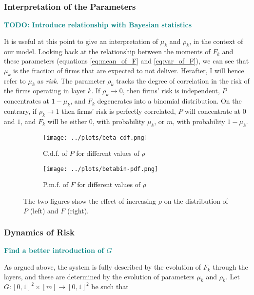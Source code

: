 \documentclass[american, abstract=on]{scrartcl}
\theoremstyle{plain}
\newcommand\notes[1]{\textcolor{teal}{\footnotesize \textbf{#1}}}
\begin{document}
\subsubsection{Interpretation of the Parameters}

\notes{TODO: Introduce relationship with Bayesian statistics}

It is useful at this point to give an interpretation of $\mu_k$ and $\rho_k$, in the context of our model. Looking back at the relationship between the moments of $F_k$ and these parameters (equations \ref{eq:mean_of_F} and \ref{eq:var_of_F}), we can see that $\mu_k$ is the fraction of firms that are expected to not deliver. Herafter, I will hence refer to $\mu_k$ as \textit{risk}. The parameter $\rho_k$ tracks the degree of correlation in the risk of the firms operating in layer $k$. If $\rho_k \to 0$, then firms' risk is independent, $P$ concentrates at $1 - \mu_k$, and $F_k$ degenerates into a binomial distribution. On the contrary, if $\rho_k \rightarrow 1$ then firms' risk is perfectly correlated, $P$ will concentrate at $0$ and $1$, and $F_k$ will be either 0, with probability $\mu_k$, or $m$, with probability $1 - \mu_k$.



\begin{figure}[H]
  \centering
  \begin{subfigure}{.5\textwidth}
    \centering
    \texttt{[image: ../plots/beta-cdf.png]}
    \caption{C.d.f. of $P$ for different values of $\rho$}
    \label{fig:distribution-illustration:beta}
  \end{subfigure}%
  \begin{subfigure}{.5\textwidth}
    \centering
    \texttt{[image: ../plots/betabin-pdf.png]} 
    \caption{P.m.f. of $F$ for different values of $\rho$}
    \label{fig:distribution-illustration:beta-binomial}
  \end{subfigure}%
  \caption{The two figures show the effect of increasing $\rho$ on the distribution of $P$ (left) and $F$ (right).}
  \label{fig:distribution-illustration}
\end{figure}

\subsubsection{Dynamics of Risk}

\notes{Find a better introduction of $G$}

As argued above, the system is fully described by the evolution of $F_k$ through the layers, and these are determined by the evolution of parameters $\mu_k$ and $\rho_k$. Let $G: [0, 1]^2 \times [m] \to [0, 1]^2$ be such that
\end{document}
